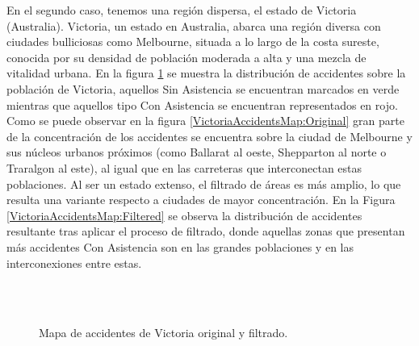 En el segundo caso, tenemos una región dispersa, el estado de Victoria (Australia). Victoria, un estado en Australia, abarca una región diversa con ciudades bulliciosas como Melbourne, situada a lo largo de la costa sureste, conocida por su densidad de población moderada a alta y una mezcla de vitalidad urbana. En la figura \ref{VictoriaAccidentsMap} se muestra la distribución de accidentes sobre la población de Victoria, aquellos Sin Asistencia se encuentran marcados en verde mientras que aquellos tipo Con Asistencia se encuentran representados en rojo. Como se puede observar en la figura \ref{VictoriaAccidentsMap:Original} gran parte de la concentración de los accidentes se encuentra sobre la ciudad de Melbourne y sus núcleos urbanos próximos (como Ballarat al oeste, Shepparton al norte o Traralgon al este), al igual que en las carreteras que interconectan estas poblaciones. Al ser un estado extenso, el filtrado de áreas es más amplio, lo que resulta una variante respecto a ciudades de mayor concentración. En la Figura \ref{VictoriaAccidentsMap:Filtered} se observa la distribución de accidentes resultante tras aplicar el proceso de filtrado, donde aquellas zonas que presentan más accidentes Con Asistencia son en las grandes poblaciones y en las interconexiones entre estas.


\begin{figure}[H]
	\centering
	\\
	\\
	\caption{Mapa de accidentes de Victoria original y filtrado.}
	\label{VictoriaAccidentsMap}
\end{figure}


